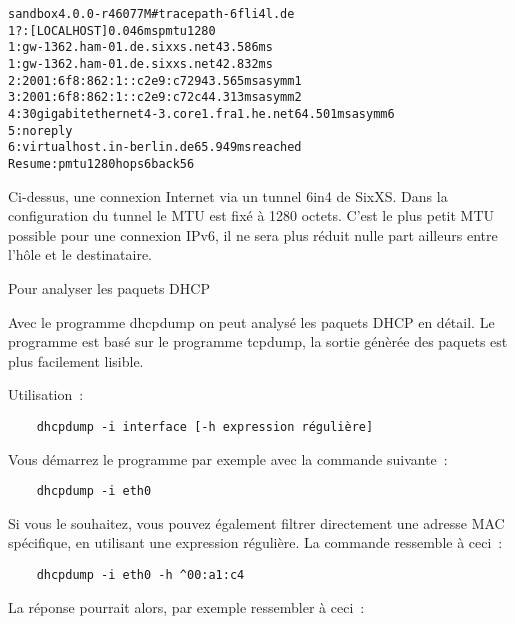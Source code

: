 \begin{description}
    \begin{example}
    \begin{alltt}
    sandbox 4.0.0-r46077M \# tracepath -6 fli4l.de
     1?: [LOCALHOST]                        0.046ms pmtu 1280
     1:  gw-1362.ham-01.de.sixxs.net                          43.586ms
     1:  gw-1362.ham-01.de.sixxs.net                          42.832ms
     2:  2001:6f8:862:1::c2e9:c729                            43.565ms asymm  1
     3:  2001:6f8:862:1::c2e9:c72c                            44.313ms asymm  2
     4:  30gigabitethernet4-3.core1.fra1.he.net               64.501ms asymm  6
     5:  no reply
     6:  virtualhost.in-berlin.de                             65.949ms reached
         Resume: pmtu 1280 hops 6 back 56
    \end{alltt}
    \end{example}

	Ci-dessus, une connexion Internet via un tunnel 6in4 de SixXS. Dans la configuration du tunnel
	le MTU est fixé à 1280 octets. C'est le plus petit MTU possible pour une connexion IPv6, il
	ne sera plus réduit nulle part ailleurs entre l'hôle et le destinataire.

 Pour analyser les paquets DHCP

    Avec le programme dhcpdump on peut analysé les paquets DHCP en détail.
    Le programme est basé sur le programme tcpdump, la sortie génèrée des paquets
    est plus facilement lisible.

    Utilisation~:

\begin{verbatim}
    dhcpdump -i interface [-h expression régulière]
\end{verbatim}

    Vous démarrez le programme par exemple avec la commande suivante~:

\begin{verbatim}
    dhcpdump -i eth0
\end{verbatim}

    Si vous le souhaitez, vous pouvez également filtrer directement une adresse
    MAC spécifique, en utilisant une expression régulière. La commande ressemble
    à ceci~:

\begin{verbatim}
    dhcpdump -i eth0 -h ^00:a1:c4
\end{verbatim}

    La réponse pourrait alors, par exemple ressembler à ceci~:


\end{description}
